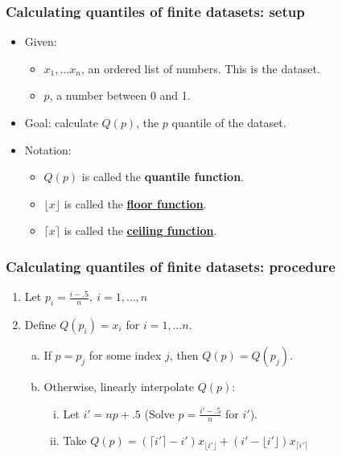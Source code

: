 \documentclass[handout]{beamer}
\numberwithin{equation}{section}
\begin{document}
\begin{frame}
\frametitle{Calculating quantiles of finite datasets: setup}

\begin{itemize}
\item Given:
\begin{itemize}
\item $x_1, \ldots x_n$, an ordered list of numbers. This is the dataset.
\pause \item $p$, a number between 0 and 1.
\end{itemize}
\pause \item Goal: calculate $Q(p)$, the $p$ quantile of the dataset.
\pause \item Notation:
\begin{itemize}
 \item $Q(p)$ is called the {\bf quantile function}.
\pause \item $\lfloor x \rfloor$ is called the {\bf \href{http://en.wikipedia.org/wiki/Floor\_and\_ceiling\_functions}{floor function}}.
\pause \item $\lceil x \rceil$ is called the {\bf \href{http://en.wikipedia.org/wiki/Floor\_and\_ceiling\_functions}{ceiling function}}.
\end{itemize}

\end{itemize}
\end{frame}




\begin{frame}
\frametitle{Calculating quantiles of finite datasets: procedure}
\begin{enumerate}[1. ]
\item Let $p_i = \frac{i-.5}{n}, \ i = 1, \ldots, n$
\pause \item Define $Q(p_i) = x_i $ for $i = 1, \ldots n$.
\begin{enumerate}[a. ]
\pause \item If $p = p_j$ for some index $j$, then $Q(p) = Q(p_j)$.
\pause \item Otherwise, linearly interpolate $Q(p)$:
\begin{enumerate}[i. ]
\pause \item Let $i' = np+.5$ (Solve $p = \frac{i'-.5}{n}$ for $i'$).
\pause \item Take $Q(p) = (\lceil i' \rceil -i')x_{\lfloor i' \rfloor} + (i'-\lfloor i' \rfloor)x_{\lceil i' \rceil}$
\end{enumerate}
\end{enumerate}
\end{enumerate}
\end{frame}
\end{document}
